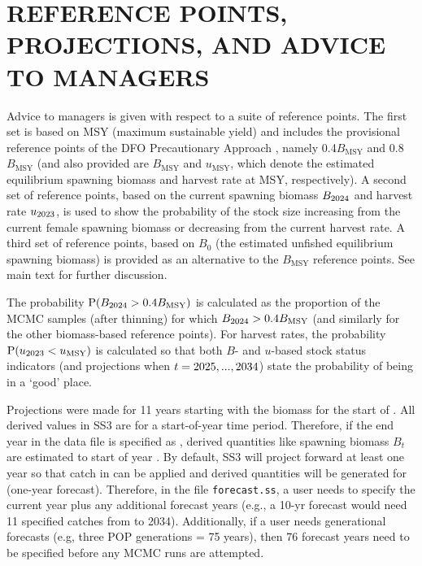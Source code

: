 \documentclass[11pt]{book}
\newcommand{\Bmsy}{B_\text{MSY}}
\newcommand{\umsy}{u_\text{MSY}}
\newcommand{\code}[1]{\normalsize\texttt{#1}\normalsize}%
\begin{document}
\section{REFERENCE POINTS, PROJECTIONS, AND ADVICE TO MANAGERS}

Advice to managers is given with respect to a suite of reference points.
The first set is based on MSY (maximum sustainable yield) and includes the provisional reference points of the DFO Precautionary Approach \citep{DFO-SAR:2006_pa}, namely 0.4$\Bmsy$ and 0.8$\Bmsy$ (and also provided are $\Bmsy$ and $\umsy$, which denote the estimated equilibrium spawning biomass and harvest rate at MSY, respectively). 
A second set of reference points, based on the current spawning biomass $B_{2024}$ and harvest rate $u_{2023}$, is used to show the probability of the stock size increasing from the current female spawning biomass or decreasing from the current harvest rate.
A third set of reference points, based on $B_0$ (the estimated unfished equilibrium spawning biomass) is provided as an alternative to the $\Bmsy$ reference points.
See main text for further discussion.

The probability $\text{P}(B_{\finalYr} > 0.4\Bmsy)$ is calculated as the proportion of the \Nbase{} MCMC samples (after thinning) for which $B_{\finalYr} > 0.4\Bmsy$ (and similarly for the other biomass-based reference points).
For harvest rates, the probability $\text{P}(u_{\prevYear} < \umsy)$ is calculated so that both $B$- and $u$-based stock status indicators (and projections when $t=2025,...,2034$) state the probability of being in a `good' place.

Projections were made for 11 years starting with the biomass for the start of \currYear.
All derived values in SS3 are for a start-of-year time period.
Therefore, if the end year in the data file is specified as \prevYear, derived quantities like spawning biomass $B_t$ are estimated to start of year \prevYear.
By default, SS3 will project forward at least one year so that catch in \prevYear{} can be applied and derived quantities will be generated for \currYear{} (one-year forecast).
Therefore, in the file \code{forecast.ss}, a user needs to specify the current year plus any additional forecast years (e.g., a 10-yr forecast would need 11 specified catches from \currYear{} to 2034).
Additionally, if a user needs generational forecasts (e.g, three POP generations = 75 years), then 76 forecast years need to be specified before any MCMC runs are attempted.
\end{document}
